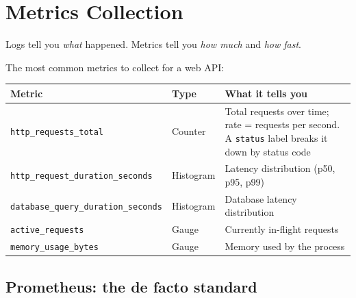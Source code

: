\setcounter{section}{3}
\section{Metrics Collection}\label{35-observability:354-metrics-collection}

Logs tell you \emph{what} happened. Metrics tell you \emph{how much} and \emph{how fast}.

The most common metrics to collect for a web API:


{\def\LTcaptype{none} %
\begin{longtable}[]{@{}
  >{\raggedright\arraybackslash}p{}
  >{\raggedright\arraybackslash}p{}
  >{\raggedright\arraybackslash}p{}@{}}
\toprule\noalign{}
\begin{minipage}[b]{\linewidth}\raggedright
Metric
\end{minipage} & \begin{minipage}[b]{\linewidth}\raggedright
Type
\end{minipage} & \begin{minipage}[b]{\linewidth}\raggedright
What it tells you
\end{minipage} \\
\midrule\noalign{}
\endhead
\bottomrule\noalign{}
\endlastfoot
\texttt{http\_requests\_total} & Counter & Total requests over time; rate = requests per second. A \texttt{status} label breaks it down by status code \\
\texttt{http\_}\allowbreak{}\texttt{request\_}\allowbreak{}\texttt{duration\_}\allowbreak{}\texttt{seconds} & Histogram & Latency distribution (p50, p95, p99) \\
\texttt{database\_}\allowbreak{}\texttt{query\_}\allowbreak{}\texttt{duration\_}\allowbreak{}\texttt{seconds} & Histogram & Database latency distribution \\
\texttt{active\_requests} & Gauge & Currently in-flight requests \\
\texttt{memory\_usage\_bytes} & Gauge & Memory used by the process \\
\end{longtable}
}

\subsection*{Prometheus: the de facto standard}\label{35-observability:prometheus-the-de-facto-standard}

